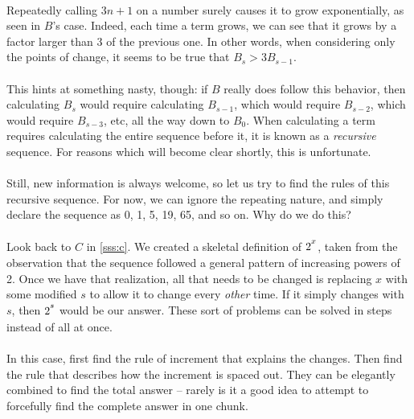 \documentclass[12pt,letterpaper]{article}
\begin{document}
			\paragraph{} Repeatedly calling $3n + 1$ on a number surely causes it to grow exponentially, as seen in $B$'s case. Indeed, each time a term grows, we can see that it grows by a factor larger than 3 of the previous one. In other words, when considering only the points of change, it seems to be true that $B_s > 3B_{s-1}$.
			
			\paragraph{} This hints at something nasty, though: if $B$ really does follow this behavior, then calculating $B_s$ would require calculating $B_{s-1}$, which would require $B_{s-2}$, which would require $B_{s-3}$, etc, all the way down to $B_0$. When calculating a term requires calculating the entire sequence before it, it is known as a \textit{recursive} sequence. For reasons which will become clear shortly, this is unfortunate.
			
			\paragraph{} Still, new information is always welcome, so let us try to find the rules of this recursive sequence. For now, we can ignore the repeating nature, and simply declare the sequence as 0, 1, 5, 19, 65, and so on. Why do we do this? 
			
			\paragraph{} Look back to $C$ in \ref{sss:c}. We created a skeletal definition of $2\strut^x$, taken from the observation that the sequence followed a general pattern of increasing powers of 2. Once we have that realization, all that needs to be changed is replacing $x$ with some modified $s$ to allow it to change every \textit{other} time. If it simply changes with $s$, then $2\strut^s$ would be our answer. These sort of problems can be solved in steps instead of all at once. 
			
			\paragraph{} In this case, first find the rule of increment that explains the changes. Then find the rule that describes how the increment is spaced out. They can be elegantly combined to find the total answer -- rarely is it a good idea to attempt to forcefully find the complete answer in one chunk.
			
\end{document}
